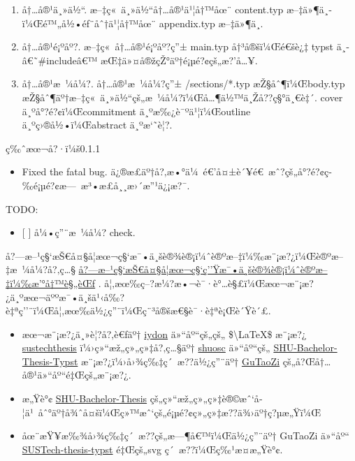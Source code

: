 \begin{itemize}
  \begin{enumerate}
  \tightlist
  \item
    å†\ldots å®¹ä¸»ä½``. æ--‡ç«~ä¸»ä½``å†\ldots å®¹ä¹¦å†™åœ¨ content.typ
    æ--‡ä»¶ä¸­ï¼Œé™„å½•éƒ¨åˆ†ä¹¦å†™åœ¨ appendix.typ æ--‡ä»¶ä¸­.
  \item
    å†\ldots å®¹é¡ºåº?. æ--‡ç«~å†\ldots å®¹é¡ºåº?ç''± main.typ
    å†³å®šï¼Œé€šè¿‡ typst ä¸­ â€˜\#includeâ€™
    æŒ‡ä»¤å®žçŽ°äº†é¡µé?¢çš„æ?'å\ldots¥.
  \item
    å†\ldots å®¹æ~¼å¼?. å†\ldots å®¹æ~¼å¼?ç''± /sections/*.typ
    æŽ§åˆ¶ï¼Œbody.typ
    æŽ§åˆ¶äº†æ--‡ç«~ä¸»ä½``çš„æ~¼å¼?ï¼Œå\ldots¶ä½™ä¸Žå??ç§°ä¸€è‡´. cover
    ä¸ºå°?é?¢ï¼Œcommitment ä¸ºæ‰¿è¯ºä¹¦ï¼Œoutline ä¸ºç›®å½•ï¼Œabstract
    ä¸ºæ`˜è¦?.
  \end{enumerate}
\end{itemize}

ç‰ˆæœ¬å?·ï¼š0.1.1

\begin{itemize}
\tightlist
\item
  Fixed the fatal bug.
  ä¿®æ­£äº†å?‚æ•°ä¼~é€'å¤±è´¥é€~æˆ?çš„å°?é?¢ç­‰é¡µé?¢æ---~æ³•æ­£å¸¸æ›´æ''¹ä¿¡æ?¯.
\end{itemize}

TODO:

\begin{itemize}
\tightlist
\item
  {[} {]} å¼•ç''¨æ~¼å¼? check.
\end{itemize}

å?---æ--¹ç§`æŠ€å¤§å­¦æœ¬ç§`æ¯•ä¸šè®¾è®¡ï¼ˆè®ºæ--‡ï¼‰æ¨¡æ?¿ï¼Œè®ºæ--‡æ~¼å¼?å?‚ç\ldots§
\href{https://tao.sustech.edu.cn/studentService/graduation_project.html}{å?---æ--¹ç§`æŠ€å¤§å­¦æœ¬ç§`ç''Ÿæ¯•ä¸šè®¾è®¡ï¼ˆè®ºæ--‡ï¼‰æ'°å†™è§„èŒƒ}
.
å¦‚æœ‰ç--?æ¼?æ•¬è¯·è°\ldots è§£ï¼Œæœ¬æ¨¡æ?¿ä¸ºæœ¬äººæ¯•ä¸šä¹‹å‰?è‡ªç''¨ï¼Œå¦‚æœ‰ä½¿ç''¨ï¼Œç¨³å®šæ€§è¯·è‡ªè¡Œè´Ÿè´£.

\begin{itemize}
\item
  æœ¬æ¨¡æ?¿ä¸»è¦?å?‚è€ƒäº† \href{https://github.com/iydon}{iydon}
  ä»``åº``çš„çš„ \$\textbackslash LaTeX\$ æ¨¡æ?¿
  \href{https://github.com/iydon/sustechthesis}{sustechthesis}
  ï¼›ç»``æž„ç»„ç»‡å?‚ç\ldots§äº†
  \href{https://github.com/shuosc}{shuosc} ä»``åº``çš„
  \href{https://github.com/shuosc/SHU-Bachelor-Thesis-Typst}{SHU-Bachelor-Thesis-Typst}
  æ¨¡æ?¿ï¼›å›¾ç‰‡ç´~æ??ä½¿ç''¨äº†
  \href{https://github.com/GuTaoZi}{GuTaoZi}
  çš„å?Œå†\ldots å®¹ä»``åº``é‡Œçš„æ¨¡æ?¿.
\item
  æ„Ÿè°¢
  \href{https://github.com/shuosc/SHU-Bachelor-Thesis-Typst}{SHU-Bachelor-Thesis}
  çš„ç»``æž„ç»„ç»‡è®©æˆ`å­¦ä¹~åˆ°äº†å¾ˆå¤šï¼Œç»™æˆ`çš„é¡µé?¢ç»„ç»‡æ??ä¾›äº†ç?µæ„Ÿï¼Œ
\item
  åœ¨æŸ¥æ‰¾å›¾ç‰‡ç´~æ??çš„æ---¶å€™ï¼Œä½¿ç''¨äº† GuTaoZi ä»``åº``
  \href{https://github.com/GuTaoZi/SUSTech-thesis-typst}{SUSTech-thesis-typst}
  é‡Œçš„svg ç´~æ??ï¼Œç‰¹æ­¤æ„Ÿè°¢.
\end{itemize}

